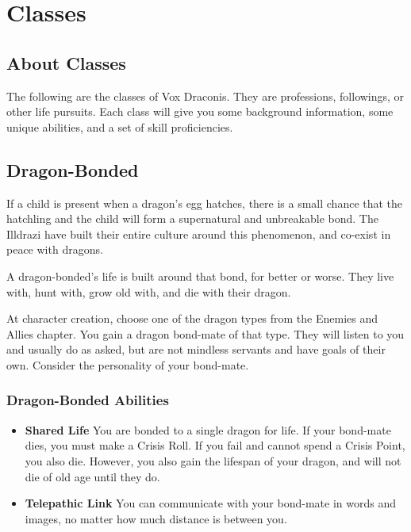 \chapter{Classes}

\begin{multicols}{2}

\section{About Classes}

The following are the classes of Vox Draconis. They are professions, 
followings, or other life pursuits. Each class will give you some 
background information, some unique abilities, and a set of skill 
proficiencies.

\section{Dragon-Bonded}

If a child is present when a dragon's egg hatches, there is a small 
chance that the hatchling and the child will form a supernatural and 
unbreakable bond. The Illdrazi have built their entire culture around 
this phenomenon, and co-exist in peace with dragons.

A dragon-bonded's life is built around that bond, for better or worse. 
They live with, hunt with, grow old with, and die with their dragon.

At character creation, choose one of the dragon types from the 
Enemies and Allies chapter. You gain a dragon bond-mate of that 
type. They will listen to you and usually do as asked, but are 
not mindless servants and have goals of their own. Consider the 
personality of your bond-mate.

\subsection{Dragon-Bonded Abilities}

\begin{itemize}
    \item \textbf{Shared Life} You are bonded to a single dragon for 
    life. If your bond-mate dies, you must make a Crisis Roll. If you 
    fail and cannot spend a Crisis Point, you also die. However, you 
    also gain the lifespan of your dragon, and will not die of old age until 
    they do.
    \item \textbf{Telepathic Link} You can communicate with your bond-mate in 
    words and images, no matter how much distance is between you.
\end{itemize}


\end{multicols}
